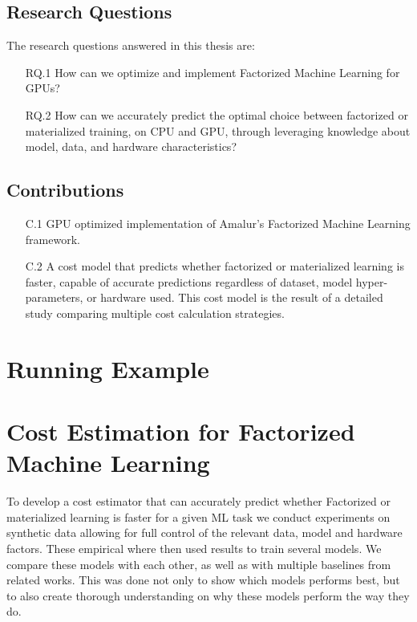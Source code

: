 \subsection{Research Questions}
The research questions answered in this thesis are:
\begin{itemize}
    \item[RQ.1] How can we optimize and implement Factorized Machine Learning for GPUs?
    \item[RQ.2] How can we accurately predict the optimal choice between factorized or materialized training, on CPU and GPU, through leveraging knowledge about model, data, and hardware characteristics?
\end{itemize}

\subsection{Contributions}
\begin{enumerate}
    \item[C.1] GPU optimized implementation of Amalur's Factorized Machine Learning framework.
    \item[C.2] A cost model that predicts whether factorized or materialized learning is faster, capable of accurate predictions regardless of dataset, model hyper-parameters, or hardware used. This cost model is the result of a detailed study comparing multiple cost calculation strategies.
\end{enumerate}

\section{Running Example}

\section{Cost Estimation for Factorized Machine Learning}
To develop a cost estimator that can accurately predict whether Factorized or materialized learning is faster for a given ML task we conduct experiments on synthetic data allowing for full control of the relevant data, model and hardware factors. These empirical where then used results to train several models. We compare these models with each other, as well as with multiple baselines from related works. This was done not only to show which models performs best, but to also create thorough understanding on why these models perform the way they do.

